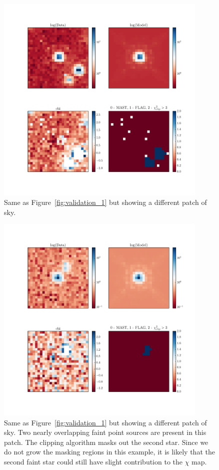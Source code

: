 \begin{figure}
\includegraphics[width=0.9\textwidth , height=0.9\textwidth ]{figures/wfc3ir/example5.pdf}
\caption{\label{fig:validation_2} Same as Figure~\ref{fig:validation_1} but showing a different patch of sky.}
\end{figure}

\begin{figure}
\includegraphics[width=0.9\textwidth]{figures/wfc3ir/example7.pdf}
\caption{\label{fig:validation_3} Same as Figure~\ref{fig:validation_1} but showing a different patch of sky. Two nearly overlapping faint point sources are present in this patch. 
The clipping algorithm masks out the second star. Since we do not grow the masking regions in this example, it is likely that the second faint star could still have slight contribution to the $\chi$ map.}
\end{figure}

